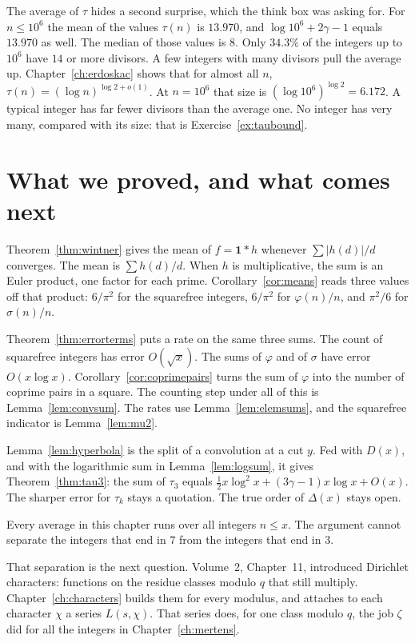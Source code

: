 The average of $\tau$ hides a second surprise, which the think box was asking for. For $n\le10^6$ the mean of the values $\tau(n)$ is $13.970$, and $\log10^6+2\gamma-1$ equals $13.970$ as well. The median of those values is $8$. Only $34.3\%$ of the integers up to $10^6$ have $14$ or more divisors. A few integers with many divisors pull the average up. Chapter~\ref{ch:erdoskac} shows that for almost all $n$, $\tau(n)=(\log n)^{\log2+o(1)}$. At $n=10^6$ that size is $(\log10^6)^{\log2}=6.172$. A typical integer has far fewer divisors than the average one. No integer has very many, compared with its size: that is Exercise~\ref{ex:taubound}.

\section{What we proved, and what comes next}

Theorem~\ref{thm:wintner} gives the mean of $f=\mathbf1*h$ whenever $\sum|h(d)|/d$ converges. The mean is $\sum h(d)/d$. When $h$ is multiplicative, the sum is an Euler product, one factor for each prime. Corollary~\ref{cor:means} reads three values off that product: $6/\pi^2$ for the squarefree integers, $6/\pi^2$ for $\varphi(n)/n$, and $\pi^2/6$ for $\sigma(n)/n$.

Theorem~\ref{thm:errorterms} puts a rate on the same three sums. The count of squarefree integers has error $O(\sqrt x)$. The sums of $\varphi$ and of $\sigma$ have error $O(x\log x)$. Corollary~\ref{cor:coprimepairs} turns the sum of $\varphi$ into the number of coprime pairs in a square. The counting step under all of this is Lemma~\ref{lem:convsum}. The rates use Lemma~\ref{lem:elemsums}, and the squarefree indicator is Lemma~\ref{lem:mu2}.

Lemma~\ref{lem:hyperbola} is the split of a convolution at a cut $y$. Fed with $D(x)$, and with the logarithmic sum in Lemma~\ref{lem:logsum}, it gives Theorem~\ref{thm:tau3}: the sum of $\tau_3$ equals $\frac12 x\log^2 x+(3\gamma-1)x\log x+O(x)$. The sharper error for $\tau_k$ stays a quotation. The true order of $\Delta(x)$ stays open.

Every average in this chapter runs over all integers $n\le x$. The argument cannot separate the integers that end in $7$ from the integers that end in $3$.

That separation is the next question. Volume~2, Chapter~11, introduced Dirichlet characters: functions on the residue classes modulo $q$ that still multiply. Chapter~\ref{ch:characters} builds them for every modulus, and attaches to each character $\chi$ a series $L(s,\chi)$. That series does, for one class modulo $q$, the job $\zeta$ did for all the integers in Chapter~\ref{ch:mertens}.

